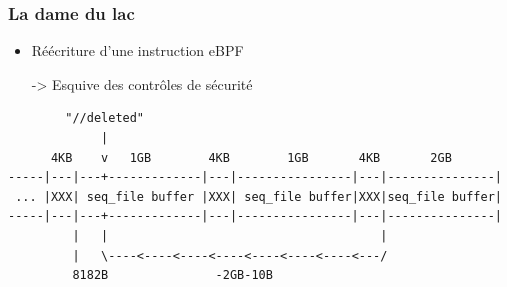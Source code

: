 \documentclass{beamer}
\begin{document}
\begin{frame}[fragile]
    \frametitle{La dame du lac}

    \begin{itemize}
        \item Réécriture d'une instruction eBPF
        \item[->]Esquive des contrôles de sécurité
    \end{itemize}
        \begin{verbatim}
        "//deleted"
             |
      4KB    v   1GB        4KB        1GB       4KB       2GB
-----|---|---+-------------|---|----------------|---|---------------|
 ... |XXX| seq_file buffer |XXX| seq_file buffer|XXX|seq_file buffer|
-----|---|---+-------------|---|----------------|---|---------------|
         |   |                                      |
         |   \----<----<----<----<----<----<----<---/
         8182B               -2GB-10B
    \end{verbatim} 
\end{frame}
\end{document}
